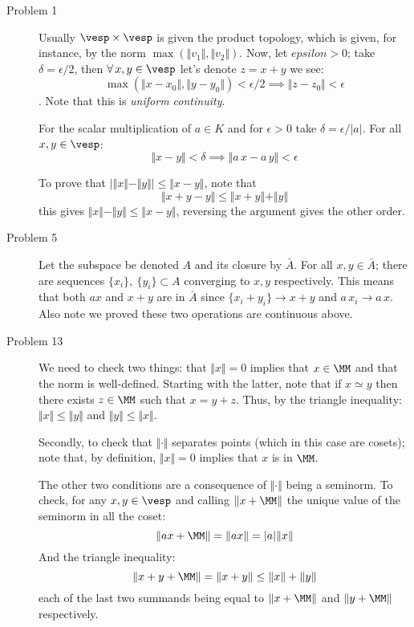 \begin{description}
    \item[Problem 1] Usually $\vesp\times \vesp$ is given the product topology, which is given, for instance, by the norm $\max(\Vert v_1\Vert,\Vert v_2\Vert)$. Now, let $epsilon>0$; take $\delta=\epsilon/2$, then $\forall \, x,y\in \vesp$ let's denote $z=x+y$ we see:
    $$    \max(\Vert x-x_0\Vert,\Vert y-y_0\Vert) < \epsilon/2 \implies \Vert z-z_0\Vert< \epsilon $$.
    Note that this is \emph{uniform continuity}.

    For the scalar multiplication of $a\in K$ and for $\epsilon>0$ take $\delta=\epsilon/|a|$. For all $x, y \in \vesp$:
    $$\Vert x -  y\Vert < \delta \implies \Vert a\, x - a\, y \Vert < \epsilon$$ 

    To prove that $|\Vert x \Vert - \Vert y \Vert | \leq \Vert x-y\Vert$, note that 
    $$\Vert x + y -y \Vert \leq \Vert x+ y\Vert + \Vert y \Vert$$
    this gives $\Vert x\Vert - \Vert y \Vert \leq \Vert x-y\Vert$, reversing the argument gives the other order.
\item[Problem 5] Let the subspace be denoted $A$ and its closure by $\bar A$. For all $x,y \in \bar A$; there are  sequences $\{x_i\},\ \{y_i\}\subset A$ converging to $x,y$ respectively. This means that both $ax$ and $x+y$ are in $ \bar A$ since $\{x_i+ y_i\}\to x+y$ and $a\, x_i \to a\, x$. Also note we proved these two operations are continuous above.
    \item[Problem 13] We  need to check two things: that $\Vert x\Vert=0$ implies that $x\in \MM$ and that the norm is well-defined. Starting with the latter, note that if $x\simeq y$ then there exists $z\in \MM$ such that $x=y+z$. Thus, by the triangle inequality: $\Vert x\Vert \leq \Vert y\Vert$ and $\Vert y\Vert \leq \Vert x\Vert$.

        Secondly, to check that $\Vert \cdot \Vert$ separates points (which in this case are cosets); note that, by definition,  $\Vert x\Vert=0$ implies that $x$ is in $\MM$.
        
        The other two conditions are a consequence of $\Vert \cdot \Vert$ being a seminorm. To check, for any $x,y\in \vesp$ and calling $\Vert x+\MM \Vert$ the unique value of the seminorm in all the coset:
        $$\Vert ax+\MM\Vert = \Vert ax\Vert = |a|\Vert x\Vert$$
        And the triangle inequality:
        $$\Vert x+y +\MM \Vert = \Vert x+y \Vert \leq \Vert x\Vert + \Vert y \Vert$$
        each of the last two summands being equal to $\Vert x+\MM\Vert$ and $\Vert y+\MM\Vert$ respectively.
\end{description}
